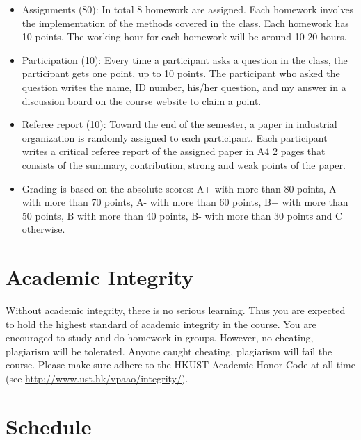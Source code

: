 \documentclass[]{book}
\providecommand{\tightlist}{%
  \setlength{\itemsep}{0pt}\setlength{\parskip}{0pt}}
\theoremstyle{definition}
\theoremstyle{definition}
\theoremstyle{definition}
\theoremstyle{remark}
\begin{document}
\begin{itemize}
\tightlist
\item
  Assignments (80): In total 8 homework are assigned. Each homework
  involves the implementation of the methods covered in the class. Each
  homework has 10 points. The working hour for each homework will be
  around 10-20 hours.
\item
  Participation (10): Every time a participant asks a question in the
  class, the participant gets one point, up to 10 points. The
  participant who asked the question writes the name, ID number, his/her
  question, and my answer in a discussion board on the course website to
  claim a point.
\item
  Referee report (10): Toward the end of the semester, a paper in
  industrial organization is randomly assigned to each participant. Each
  participant writes a critical referee report of the assigned paper in
  A4 2 pages that consists of the summary, contribution, strong and weak
  points of the paper.
\item
  Grading is based on the absolute scores: A+ with more than 80 points,
  A with more than 70 points, A- with more than 60 points, B+ with more
  than 50 points, B with more than 40 points, B- with more than 30
  points and C otherwise.
\end{itemize}

\section{Academic Integrity}\label{academic-integrity}

Without academic integrity, there is no serious learning. Thus you are
expected to hold the highest standard of academic integrity in the
course. You are encouraged to study and do homework in groups. However,
no cheating, plagiarism will be tolerated. Anyone caught cheating,
plagiarism will fail the course. Please make sure adhere to the HKUST
Academic Honor Code at all time (see
\url{http://www.ust.hk/vpaao/integrity/}).

\section{Schedule}\label{schedule}
\end{document}
